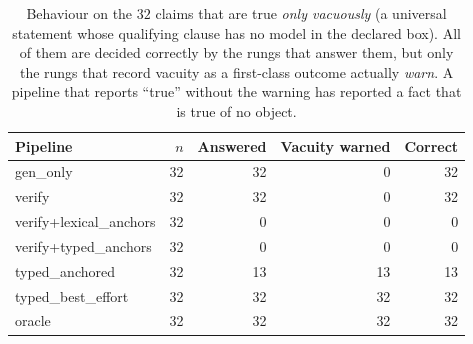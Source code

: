 \begin{table}[t]
\centering
\caption{Behaviour on the $32$ claims that are true \emph{only vacuously} (a universal statement whose qualifying clause has no model in the declared box). All of them are decided correctly by the rungs that answer them, but only the rungs that record vacuity as a first-class outcome actually \emph{warn}. A pipeline that reports ``true'' without the warning has reported a fact that is true of no object.}
\label{tab:vacuity}
\small
\begin{tabular}{lrrrr}
\toprule
Pipeline & $n$ & Answered & Vacuity warned & Correct \\
\midrule
gen\_only & 32 & 32 & 0 & 32 \\
verify & 32 & 32 & 0 & 32 \\
verify+lexical\_anchors & 32 & 0 & 0 & 0 \\
verify+typed\_anchors & 32 & 0 & 0 & 0 \\
typed\_anchored & 32 & 13 & 13 & 13 \\
typed\_best\_effort & 32 & 32 & 32 & 32 \\
oracle & 32 & 32 & 32 & 32 \\
\bottomrule
\end{tabular}
\end{table}
